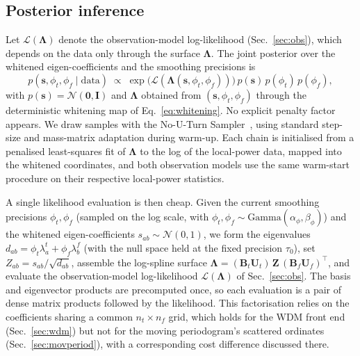 \documentclass[
  aps,
  prd,
  twocolumn,
  amsmath,
  amssymb,
  nofootinbib,
  superscriptaddress,
  longbibliography,
]{revtex4-2}
\begin{document}
\subsection{Posterior inference}
\label{sec:inference}

Let $\mathcal{L}(\bm{\Lambda})$ denote the observation-model log-likelihood
(Sec.~\ref{sec:obs}), which depends on the data only through the surface
$\bm{\Lambda}$. The joint posterior over the whitened eigen-coefficients and the
smoothing precisions is
\begin{equation}
p(\mathbf{s}, \phi_t, \phi_f \mid \text{data})
\;\propto\;
\exp\!\big(\mathcal{L}(\bm{\Lambda}(\mathbf{s},\phi_t,\phi_f))\big)\,
p(\mathbf{s})\,p(\phi_t)\,p(\phi_f),
\end{equation}
with $p(\mathbf{s}) = \mathcal{N}(\mathbf{0},\mathbf{I})$ and $\bm{\Lambda}$
obtained from $(\mathbf{s},\phi_t,\phi_f)$ through the deterministic whitening
map of Eq.~\eqref{eq:whitening}. No explicit penalty factor appears. We draw
samples with the No-U-Turn Sampler~\citep[NUTS,][]{hoffman2014_NUTS}, using
standard step-size and mass-matrix adaptation during warm-up. Each chain is
initialised from a penalised least-squares fit of $\bm{\Lambda}$ to the log of the
local-power data, mapped into the whitened coordinates, and both observation
models use the same warm-start procedure on their respective local-power
statistics.

A single likelihood evaluation is then cheap. Given the current smoothing
precisions $\phi_t,\phi_f$ (sampled on the log scale, with
$\phi_t,\phi_f\sim\mathrm{Gamma}(\alpha_\phi,\beta_\phi)$) and the whitened
eigen-coefficients $s_{ab}\sim\mathcal{N}(0,1)$, we form the eigenvalues
$d_{ab} = \phi_t\lambda^t_a + \phi_f\lambda^f_b$ (with the null space held at the
fixed precision $\tau_0$), set $Z_{ab} = s_{ab}/\sqrt{d_{ab}}$, assemble the
log-spline surface $\bm{\Lambda} = (\mathbf{B}_t\mathbf{U}_t)\,\mathbf{Z}\,
(\mathbf{B}_f\mathbf{U}_f)^\top$, and evaluate the observation-model
log-likelihood $\mathcal{L}(\bm{\Lambda})$ of Sec.~\ref{sec:obs}. The basis and
eigenvector products are precomputed once, so each evaluation is a pair of dense
matrix products followed by the likelihood. This factorisation relies on the
coefficients sharing a common $n_t\times n_f$ grid, which holds for the WDM
front end (Sec.~\ref{sec:wdm}) but not for the moving periodogram's scattered
ordinates (Sec.~\ref{sec:movperiod}), with a corresponding cost difference
discussed there.
\end{document}
